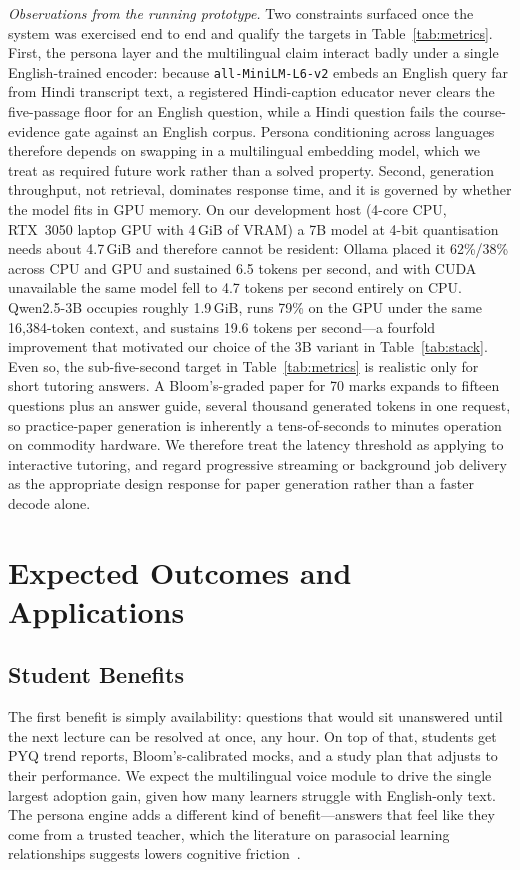 \documentclass[conference]{IEEEtran}
\begin{document}
\textit{Observations from the running prototype.} Two constraints
surfaced once the system was exercised end to end and qualify the
targets in Table~\ref{tab:metrics}. First, the persona layer and the
multilingual claim interact badly under a single English-trained
encoder: because \texttt{all-MiniLM-L6-v2} embeds an English query far
from Hindi transcript text, a registered Hindi-caption educator never
clears the five-passage floor for an English question, while a Hindi
question fails the course-evidence gate against an English corpus.
Persona conditioning across languages therefore depends on swapping in
a multilingual embedding model, which we treat as required future work
rather than a solved property. Second, generation throughput, not
retrieval, dominates response time, and it is governed by whether the
model fits in GPU memory. On our development host (4-core CPU, RTX~3050
laptop GPU with 4\,GiB of VRAM) a 7B model at 4-bit quantisation needs
about 4.7\,GiB and therefore cannot be resident: Ollama placed it
62\%/38\% across CPU and GPU and sustained 6.5 tokens per second, and
with CUDA unavailable the same model fell to 4.7 tokens per second
entirely on CPU. Qwen2.5-3B occupies roughly 1.9\,GiB, runs 79\% on the
GPU under the same 16{,}384-token context, and sustains 19.6 tokens per
second---a fourfold improvement that motivated our choice of the 3B
variant in Table~\ref{tab:stack}. Even so, the sub-five-second target
in Table~\ref{tab:metrics} is realistic only for short tutoring
answers. A Bloom's-graded paper for 70 marks expands to fifteen
questions plus an answer guide, several thousand generated tokens in
one request, so practice-paper generation is inherently a
tens-of-seconds to minutes operation on commodity hardware. We
therefore treat the latency threshold as applying to interactive
tutoring, and regard progressive streaming or background job delivery
as the appropriate design response for paper generation rather than a
faster decode alone.
\section{Expected Outcomes and Applications}
\subsection{Student Benefits}
The first benefit is simply availability: questions that would sit
unanswered until the next lecture can be resolved at once, any hour.
On top of that, students get PYQ trend reports, Bloom's-calibrated
mocks, and a study plan that adjusts to their performance. We expect
the multilingual voice module to drive the single largest adoption gain,
given how many learners struggle with English-only text. The persona
engine adds a different kind of benefit---answers that feel like they
come from a trusted teacher, which the literature on parasocial
learning relationships suggests lowers cognitive friction~\cite{zhao2024}.
\end{document}
